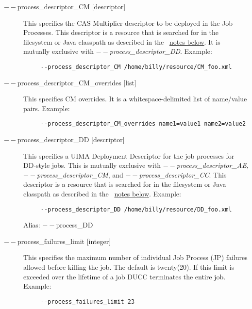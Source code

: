 \begin{description}
           \item[$--$process\_descriptor\_CM {[descriptor]} ]
             This specifies the CAS Multiplier descriptor to be deployed in the Job Processes. This 
             descriptor is a resource that is searched for in the filesystem or Java classpath as described 
             in the ~\hyperref[par:cli.submit.notes]{notes below}.
             It is mutually exclusive with {\em $--$process\_descriptor\_DD}.
             Example: 
             \begin{verbatim}             
     --process_descriptor_CM /home/billy/resource/CM_foo.xml
             \end{verbatim}

           \item[$--$process\_descriptor\_CM\_overrides {[list]}  ]
             This specifies CM overrides. It is a whitespace-delimited list of name/value pairs. Example: 
             \begin{verbatim}
     --process_descriptor_CM_overrides name1=value1 name2=value2
             \end{verbatim}
           
           \item[$--$process\_descriptor\_DD {[descriptor]}  ]
             This specifies a UIMA Deployment Descriptor for the job processes for DD-style jobs. 
             This is mutually exclusive with {\em $--$process\_descriptor\_AE}, {\em $--$process\_descriptor\_CM}, 
             and {\em $--$process\_descriptor\_CC}. This 
             descriptor is a resource that is searched for in the filesystem or Java classpath as described 
             in the ~\hyperref[par:cli.submit.notes]{notes below}.
             Example:
             \begin{verbatim}
     --process_descriptor_DD /home/billy/resource/DD_foo.xml
             \end{verbatim}
             Alias: $--$process\_DD

           \item[$--$process\_failures\_limit {[integer]} ]
             This specifies the maximum number of individual Job Process (JP) failures allowed
             before killing the job. The default is twenty(20). If this limit is exceeded over the lifetime 
             of a job DUCC terminates the entire job. 
             Example:
             \begin{verbatim}
     --process_failures_limit 23
             \end{verbatim}
                          

\end{description}

